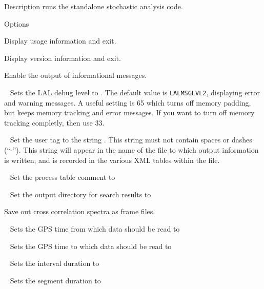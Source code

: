 \begin{entry}
\item[Description]  runs the standalone
stochastic analysis code.

\item[Options]\leavevmode
\begin{entry}
\item[\option{--help}]
Display usage information and exit.

\item[\option{--version}]
Display version information and exit.

\item[\option{--verbose}]
Enable the output of informational messages.

\item[\option{--debug-level}~\parm{N}]
Sets the LAL debug level to . The default value is
\texttt{LALMSGLVL2}, displaying error and warning messages. A useful
setting is 65 which turns off memory padding, but keeps memory tracking
and error messages. If you want to turn off memory tracking completly,
then use 33.

\item[\option{--user-tag}~\parm{STRING}]
Set the user tag to the string . This string must not
contain spaces or dashes (``-''). This string will appear in the name of
the file to which output information is written, and is recorded in the
various XML tables within the file.

\item[\option{--comment}~\parm{STRING}]
Set the process table comment to 

\item[\option{--output-dir}~\parm{DIR}]
Set the output directory for search results to 

\item[\option{--cc-spectra}]
Save out cross correlation spectra as frame files.

\item[\option{--gps-start-time}~\parm{N}]
Sets the GPS time from which data should be read to 

\item[\option{--gps-end-time}~\parm{N}]
Sets the GPS time to which data should be read to 

\item[\option{--interval-duration}~\parm{N}]
Sets the interval duration to 

\item[\option{--segment-duration}~\parm{N}]
Sets the segment duration to 


\end{entry}
\end{entry}
